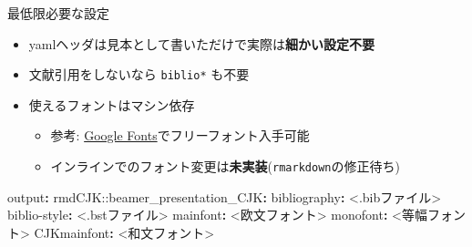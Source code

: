 \documentclass[
  12pt,
  ignorenonframetext,
]{beamer}
\newenvironment{Shaded}{\begin{snugshade}}{\end{snugshade}}
\newcommand{\AttributeTok}[1]{\textcolor[rgb]{0.77,0.63,0.00}{#1}}
\newcommand{\CharTok}[1]{\textcolor[rgb]{0.31,0.60,0.02}{#1}}
\newcommand{\FunctionTok}[1]{\textcolor[rgb]{0.00,0.00,0.00}{#1}}
\newcommand{\KeywordTok}[1]{\textcolor[rgb]{0.13,0.29,0.53}{\textbf{#1}}}
\providecommand{\tightlist}{%
  \setlength{\itemsep}{0pt}\setlength{\parskip}{0pt}}
\begin{document}
\begin{frame}[fragile]{最低限必要な設定}
\protect\hypertarget{ux6700ux4f4eux9650ux5fc5ux8981ux306aux8a2dux5b9a}{}

\begin{itemize}
\tightlist
\item
  yamlヘッダは見本として書いただけで実際は\textbf{細かい設定不要}
\item
  文献引用をしないなら \texttt{biblio*} も不要
\item
  使えるフォントはマシン依存

  \begin{itemize}
  \tightlist
  \item
    参考:
    \href{https://fonts.google.com/?category=Sans+Serif\#standard-styles}{Google
    Fonts}でフリーフォント入手可能
  \item
    インラインでのフォント変更は\textbf{未実装}(\texttt{rmarkdown}の修正待ち)
  \end{itemize}
\end{itemize}

\begin{Shaded}
\begin{Highlighting}[]
\FunctionTok{output}\KeywordTok{:}
\AttributeTok{  rmdCJK:}\FunctionTok{:beamer_presentation_CJK}\KeywordTok{:}
\FunctionTok{bibliography}\KeywordTok{: }\AttributeTok{<.bibファイル}\CharTok{>}
\FunctionTok{biblio-style}\KeywordTok{: }\AttributeTok{<.bstファイル}\CharTok{>}
\FunctionTok{mainfont}\KeywordTok{: }\AttributeTok{<欧文フォント}\CharTok{>}
\FunctionTok{monofont}\KeywordTok{: }\AttributeTok{<等幅フォント}\CharTok{>}
\FunctionTok{CJKmainfont}\KeywordTok{: }\AttributeTok{<和文フォント}\CharTok{>}
\end{Highlighting}
\end{Shaded}

\end{frame}
\end{document}
